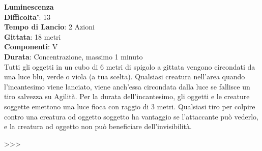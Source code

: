 \begin{multicols}{2}
\medskip\textbf{Luminescenza}\\
\textbf{Difficolta'}: 13\\
\textbf{Tempo di Lancio}: 2 Azioni\\
\textbf{Gittata}: 18 metri\\
\textbf{Componenti}: V\\
\textbf{Durata}: Concentrazione, massimo 1 minuto \\
Tutti gli oggetti in un cubo di 6 metri di spigolo a gittata vengono circondati da una luce blu,  verde o viola (a tua scelta). Qualsiasi creatura nell’area quando l’incantesimo viene lanciato, viene anch’essa circondata dalla luce se fallisce un tiro salvezza su Agilità. Per la durata dell’incantesimo, gli oggetti e le creature soggette emettono una luce fioca con raggio di 3 metri. Qualsiasi tiro per colpire contro una creatura od oggetto soggetto ha vantaggio se l’attaccante può vederlo, e la creatura od oggetto non può beneficiare dell’invisibilità.

>>>


\end{multicols}
